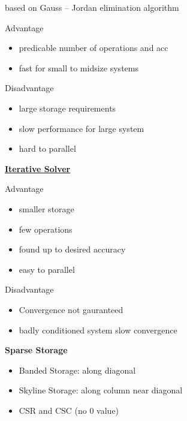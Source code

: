 \documentclass[landscape,a0paper,fontscale=0.285]{baposter} %
\newcommand{\compresslist}{ %
\setlength{\itemsep}{1pt}
\setlength{\parskip}{0pt}
\setlength{\parsep}{0pt}
}
\begin{document}
\begin{poster}
{based on Gauss – Jordan elimination algorithm

Advantage\vspace{-0.2cm}
\begin{itemize}\compresslist
    \item  predicable number of operations and acc
    \item fast for small to midsize systems
\end{itemize}
\vspace{-0.2cm}
Disadvantage\vspace{-0.2cm}
\begin{itemize}\compresslist
    \item large storage requirements
    \item slow performance for large system
    \item hard to parallel
\end{itemize}
\vspace{-0.2cm}

\underline{\textbf{Iterative Solver}}

Advantage\vspace{-0.2cm}
\begin{itemize}\compresslist
    \item smaller storage
    \item few operations
    \item found up to desired accuracy
    \item easy to parallel
\end{itemize}
\vspace{-0.2cm}

Disadvantage\vspace{-0.2cm}
\begin{itemize}\compresslist
    \item Convergence not gauranteed
    \item badly conditioned system slow convergence
\end{itemize}\vspace{-0.2cm}


\textbf{Sparse Storage}\vspace{-0.2cm}
\begin{itemize}\compresslist
    \item Banded Storage: along diagonal
    \item Skyline Storage: along column near diagonal
    \item CSR and CSC (no $0$ value)
\end{itemize}

}
\end{poster}
\end{document}
